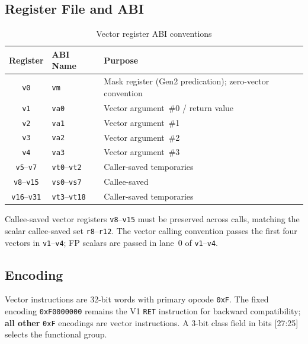 \documentclass[11pt,a4paper]{article}
\begin{document}
\subsection{Register File and ABI}

\begin{table}[H]
\centering
\caption{Vector register ABI conventions}
\begin{tabular}{cll}
\toprule
Register & ABI Name & Purpose \\
\midrule
{\tt v0}   & {\tt vm} & Mask register (Gen2 predication); zero-vector convention \\
{\tt v1}   & {\tt va0} & Vector argument~\#0 / return value \\
{\tt v2}   & {\tt va1} & Vector argument~\#1 \\
{\tt v3}   & {\tt va2} & Vector argument~\#2 \\
{\tt v4}   & {\tt va3} & Vector argument~\#3 \\
{\tt v5}--{\tt v7} & {\tt vt0}--{\tt vt2} & Caller-saved temporaries \\
{\tt v8}--{\tt v15} & {\tt vs0}--{\tt vs7} & Callee-saved \\
{\tt v16}--{\tt v31} & {\tt vt3}--{\tt vt18} & Caller-saved temporaries \\
\bottomrule
\end{tabular}
\end{table}

Callee-saved vector registers {\tt v8}--{\tt v15} must be preserved across
calls, matching the scalar callee-saved set {\tt r8}--{\tt r12}. The vector
calling convention passes the first four vectors in {\tt v1}--{\tt v4}; FP
scalars are passed in lane~0 of {\tt v1}--{\tt v4}.

\subsection{Encoding}

Vector instructions are 32-bit words with primary opcode {\tt 0xF}. The
fixed encoding {\tt 0xF0000000} remains the V1 {\tt RET} instruction for
backward compatibility; \textbf{all other} {\tt 0xF} encodings are vector
instructions. A 3-bit class field in bits [27:25] selects the functional
group.
\end{document}
